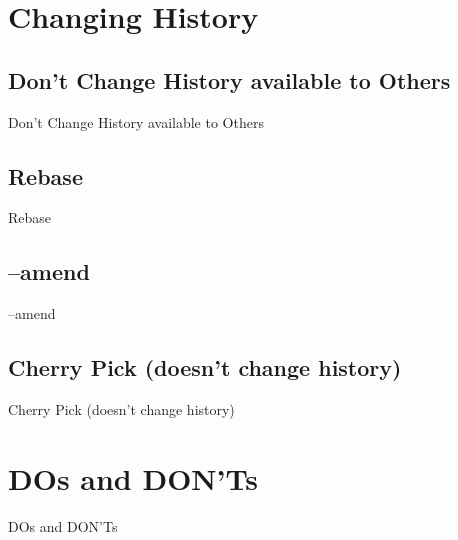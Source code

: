 \documentclass{beamer}
\begin{document}
\section{Changing History}

\subsection{Don't Change History available to Others}

\begin{frame}{Don't Change History available to Others}
\end{frame}

\subsection{Rebase}

\begin{frame}{Rebase}
\end{frame}

\subsection{--amend}

\begin{frame}{--amend}
\end{frame}

\subsection{Cherry Pick (doesn't change history)}

\begin{frame}{Cherry Pick (doesn't change history)}
\end{frame}

\section{DOs and DON'Ts}

\begin{frame}{DOs and DON'Ts}
\end{frame}
\end{document}
